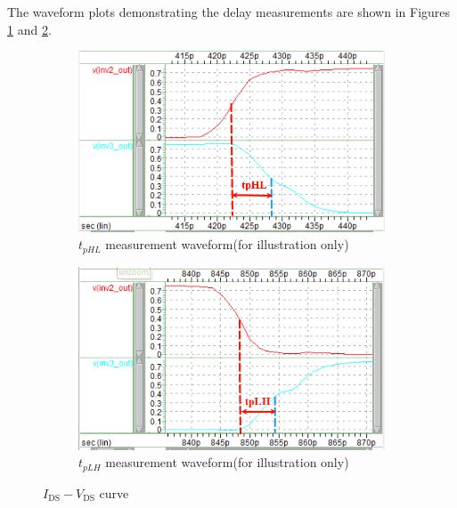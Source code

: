 \documentclass[UTF8,12pt,a4paper]{ctexart}
\begin{document}
The waveform plots demonstrating the delay measurements are shown in Figures \ref{fig:task1_tphl} and \ref{fig:task1_tplh}.

\begin{figure}[htbp]
    \centering
    \begin{subfigure}[b]{0.45\textwidth} %
        \centering
        \includegraphics[width=\textwidth]{任务书/image.png} 
        \caption{$t_{pHL}$ measurement waveform(for illustration only)}
        \label{fig:task1_tphl}
    \end{subfigure}
    \hfill %
    \begin{subfigure}[b]{0.45\textwidth}
        \centering
        \includegraphics[width=\textwidth]{任务书/image-1.png} 
        \caption{$t_{pLH}$ measurement waveform(for illustration only)}
        \label{fig:task1_tplh}
    \end{subfigure}
    \caption{$I_{\text{DS}}-V_{\text{DS}}$ curve}
    \label{fig:task1_waveform}
\end{figure}
\end{document}
